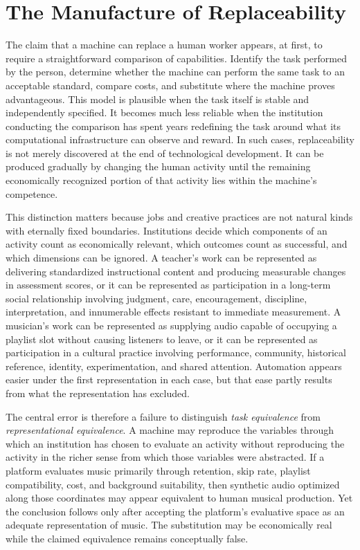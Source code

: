 \documentclass[11pt]{article}
\begin{document}
\section{The Manufacture of Replaceability}

The claim that a machine can replace a human worker appears, at first, to require a straightforward comparison of capabilities. Identify the task performed by the person, determine whether the machine can perform the same task to an acceptable standard, compare costs, and substitute where the machine proves advantageous. This model is plausible when the task itself is stable and independently specified. It becomes much less reliable when the institution conducting the comparison has spent years redefining the task around what its computational infrastructure can observe and reward. In such cases, replaceability is not merely discovered at the end of technological development. It can be produced gradually by changing the human activity until the remaining economically recognized portion of that activity lies within the machine's competence.

This distinction matters because jobs and creative practices are not natural kinds with eternally fixed boundaries. Institutions decide which components of an activity count as economically relevant, which outcomes count as successful, and which dimensions can be ignored. A teacher's work can be represented as delivering standardized instructional content and producing measurable changes in assessment scores, or it can be represented as participation in a long-term social relationship involving judgment, care, encouragement, discipline, interpretation, and innumerable effects resistant to immediate measurement. A musician's work can be represented as supplying audio capable of occupying a playlist slot without causing listeners to leave, or it can be represented as participation in a cultural practice involving performance, community, historical reference, identity, experimentation, and shared attention. Automation appears easier under the first representation in each case, but that ease partly results from what the representation has excluded.

The central error is therefore a failure to distinguish \emph{task equivalence} from \emph{representational equivalence}. A machine may reproduce the variables through which an institution has chosen to evaluate an activity without reproducing the activity in the richer sense from which those variables were abstracted. If a platform evaluates music primarily through retention, skip rate, playlist compatibility, cost, and background suitability, then synthetic audio optimized along those coordinates may appear equivalent to human musical production. Yet the conclusion follows only after accepting the platform's evaluative space as an adequate representation of music. The substitution may be economically real while the claimed equivalence remains conceptually false.
\end{document}
